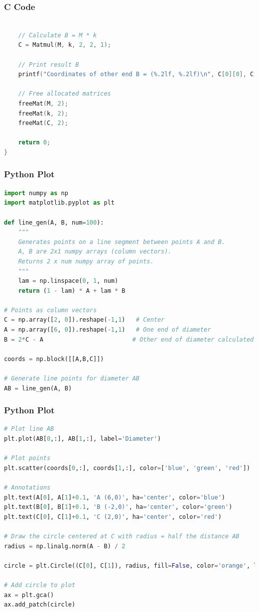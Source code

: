 \documentclass{beamer}
\theoremstyle{remark}
\numberwithin{equation}{section}
\numberwithin{equation}{section}
\begin{document}
\begin{frame}[fragile]
\frametitle{C Code }
\begin{lstlisting}[language=C]

    // Calculate B = M * k
    C = Matmul(M, k, 2, 2, 1);

    // Print result B
    printf("Coordinates of other end B = (%.2lf, %.2lf)\n", C[0][0], C[1][0]);

    // Free allocated matrices
    freeMat(M, 2);
    freeMat(k, 2);
    freeMat(C, 2);

    return 0;
}

\end{lstlisting}
\end{frame}
\begin{frame}[fragile]
\frametitle{Python Plot }
\begin{lstlisting}[language=Python]
import numpy as np
import matplotlib.pyplot as plt

def line_gen(A, B, num=100):
    """
    Generates points on a line segment between points A and B.
    A, B are 2x1 numpy arrays (column vectors).
    Returns 2 x num numpy array of points.
    """
    lam = np.linspace(0, 1, num)
    return (1 - lam) * A + lam * B

# Points as column vectors
C = np.array([2, 0]).reshape(-1,1)   # Center
A = np.array([6, 0]).reshape(-1,1)   # One end of diameter
B = 2*C - A                         # Other end of diameter calculated

coords = np.block([[A,B,C]])

# Generate line points for diameter AB
AB = line_gen(A, B)

\end{lstlisting}
\end{frame}
\begin{frame}[fragile]
\frametitle{Python Plot }
\begin{lstlisting}[language=Python]
# Plot line AB
plt.plot(AB[0,:], AB[1,:], label='Diameter')

# Plot points
plt.scatter(coords[0,:], coords[1,:], color=['blue', 'green', 'red'])

# Annotations
plt.text(A[0], A[1]+0.1, 'A (6,0)', ha='center', color='blue')
plt.text(B[0], B[1]+0.1, 'B (-2,0)', ha='center', color='green')
plt.text(C[0], C[1]+0.1, 'C (2,0)', ha='center', color='red')

# Draw the circle centered at C with radius = half the distance AB
radius = np.linalg.norm(A - B) / 2

circle = plt.Circle((C[0], C[1]), radius, fill=False, color='orange', linestyle='--', linewidth=2, label='Circle')

# Add circle to plot
ax = plt.gca()
ax.add_patch(circle)
\end{lstlisting}
\end{frame}
\end{document}
